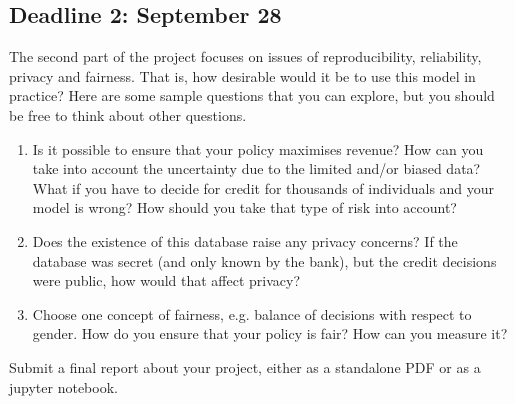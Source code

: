 \subsection{Deadline 2: September 28}
The second part of the project focuses on issues of reproducibility, reliability, privacy and fairness. That is, how desirable would it be to use this model in practice? Here are some sample questions that you can explore, but you should be free to think about other questions.
\begin{enumerate}
\item Is it possible to ensure that your policy maximises revenue? How can you take into account the uncertainty due to the limited and/or biased data? What if you have to decide for credit for thousands of individuals and your model is wrong? How should you take that type of risk into account? 
\item Does the existence of this database raise any privacy concerns? If the database was secret (and only known by the bank), but the credit decisions were public, how would that affect privacy?
\item Choose one concept of fairness, e.g. balance of decisions with respect to gender. How do you ensure that your policy is fair? How can you measure it?
\end{enumerate}

Submit a final report about your project, either as a standalone PDF or as a jupyter notebook.


